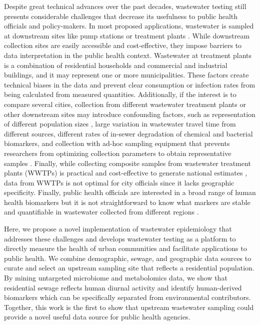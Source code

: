 Despite great technical advances over the past decades, wastewater testing still presents considerable challenges that decrease its usefulness to public health officials and policy-makers. In most proposed applications, wastewater is sampled at downstream sites like pump stations or treatment plants \cite{Manor2014,Hellmer2014}. While downstream collection sites are easily accessible and cost-effective, they impose barriers to data interpretation in the public health context. Wastewater at treatment plants is a combination of residential households and commercial and industrial buildings, and it may represent one or more municipalities. These factors create technical biases in the data and prevent clear consumption or infection rates from being calculated from measured quantities. Additionally, if the interest is to compare several cities, collection from different wastewater treatment plants or other downstream sites may introduce confounding factors, such as representation of different population sizes \cite{OBrien2013}, large variation in wastewater travel time from different sources, different rates of in-sewer degradation of chemical \cite{Thai2014} and bacterial biomarkers, and collection with ad-hoc sampling equipment that prevents researchers from optimizing collection parameters to obtain representative samples \cite{Ort2010}. Finally, while collecting composite samples from wastewater treatment plants (WWTPs) is practical and cost-effective to generate national estimates \cite{Zuccato2008,Castiglioni2006,Thomas2012}, data from WWTPs is not optimal for city officials since it lacks geographic specificity. Finally, public health officials are interested in a broad range of human health biomarkers but it is not straightforward to know what markers are stable and quantifiable in wastewater collected from different regions \cite{Arnaud2018}.

Here, we propose a novel implementation of wastewater epidemiology that addresses these challenges and develops wastewater testing as a platform to directly measure the health of urban communities and facilitate applications to public health. We combine demographic, sewage, and geographic data sources to curate and select an upstream sampling site that reflects a residential population. By mining untargeted microbiome and metabolomics data, we show that residential sewage reflects human diurnal activity and identify human-derived biomarkers which can be specifically separated from environmental contributors. Together, this work is the first to show that upstream wastewater sampling could provide a novel useful data source for public health agencies.

